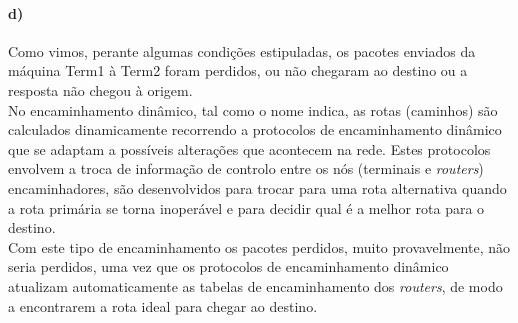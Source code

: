 \paragraph{d)}
Como vimos, perante algumas condições estipuladas, os pacotes enviados da máquina \textsf{Term1} à \textsf{Term2} foram perdidos, ou não chegaram ao destino ou a resposta não chegou à origem.\\
No encaminhamento dinâmico, tal como o nome indica, as rotas (caminhos) são calculados dinamicamente recorrendo a protocolos de encaminhamento dinâmico que se adaptam a possíveis alterações que acontecem na rede. Estes protocolos envolvem a troca de informação de controlo entre os nós (terminais e \emph{routers}) encaminhadores, são desenvolvidos para trocar para uma rota alternativa quando a rota primária se torna inoperável e para decidir qual é a melhor rota para o destino.\\
Com este tipo de encaminhamento os pacotes perdidos, muito provavelmente, não seria perdidos, uma vez que os protocolos de encaminhamento dinâmico atualizam automaticamente as tabelas de encaminhamento dos \emph{routers}, de modo a encontrarem a rota ideal para chegar ao destino.

